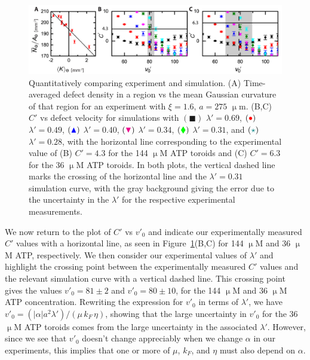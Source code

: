 \begin{figure}
  \centering
  \includegraphics{figures/C3/Ch3-Figs_MatchParam.png}
  \caption{Quantitatively comparing experiment and simulation.
  (A) Time-averaged defect density in a region vs the mean Gaussian curvature of that region for an experiment with $\xi = 1.6$, $a = 275$ $\upmu$m.
  (B,C) $C'$ vs defect velocity for simulations with
  $({\blacksquare})$ $\lambda' = 0.69$,
  $({\color{red} \bullet})$ $\lambda' = 0.49$,
  $({\color{blue} \blacktriangle})$ $\lambda' = 0.40$,
  $({\color{magenta} \blacktriangledown})$ $\lambda' = 0.34$,
  $({\color{green} \blacklozenge})$ $\lambda' = 0.31$, and
  $({\color{teal} \star})$ $\lambda' = 0.28$,
  with the horizontal line corresponding to the experimental value of (B) $C' = 4.3$ for the 144 $\upmu$M ATP toroids and (C) $C' = 6.3$ for the 36 $\upmu$M ATP toroids.
  In both plots, the vertical dashed line marks the crossing of the horizontal line and the $\lambda' = 0.31$ simulation curve, with the gray background giving the error due to the uncertainty in the $\lambda'$ for the respective experimental measurements.}\label{f:3-MatchParam}
\end{figure}

We now return to the plot of $C'$ vs $v'_0$ and indicate our experimentally measured $C'$ values with a horizontal line, as seen in Figure~\ref{f:3-MatchParam}(B,C) for 144 $\upmu$M and 36 $\upmu$M ATP, respectively.
We then consider our experimental values of $\lambda'$  and highlight the crossing point between the experimentally measured $C'$ values and the relevant simulation curve with a vertical dashed line.
This crossing point gives the values $v'_0 = 81 \pm 2$ and $v'_0 = 80 \pm 10$, for the 144 $\upmu$M and 36 $\upmu$M ATP concentration.
Rewriting the expression for $v'_0$ in terms of $\lambda'$, we have $v'_0 = (|\alpha|a^2 \lambda')/(\mu \, k_F \, \eta)$, showing that the large uncertainty in $v'_0$ for the 36 $\upmu$M ATP toroids comes from the large uncertainty in the associated $\lambda'$.
However, since we see that $v'_0$ doesn't change appreciably when we change $\alpha$ in our experiments, this implies that one or more of $\mu$, $k_F$, and $\eta$ must also depend on $\alpha$.

